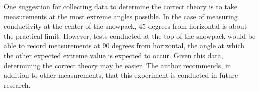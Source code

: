 One suggestion for collecting data to determine the correct theory is to take
measurements at the most extreme angles possible. In the case of measuring
conductivity at the center of the snowpack, \(45\) degrees from horizontal is
about the practical limit. However, tests conducted at the top of the snowpack
would be able to record measurements at \(90\) degrees from horizontal, the angle
at which the other expected extreme value is expected to occur. Given this data,
determining the correct theory may be easier. The author recommends, in addition
to other measurements, that this experiment is conducted in future research.
